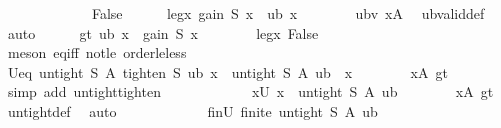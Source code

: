 \begin{isabellebody}
\ \ \ \ \isamarkupfalse%
\isanewline
\ \ \isamarkupfalse%
\isanewline
\ \ \ \ \isamarkupfalse%
\ False\isanewline
\ \ \ \ \isamarkupfalse%
\ le{\isacharunderscore}{\kern0pt}gx{\isacharcolon}{\kern0pt}\ {\isachardoublequoteopen}gain\ S\ {\isacharquery}{\kern0pt}x\ {\isasymle}\ ub\ {\isacharquery}{\kern0pt}x{\isachardoublequoteclose}\isanewline
\ \ \ \ \ \ \isamarkupfalse%
\ ubv\ xA\ \isamarkupfalse%
\ ub{\isacharunderscore}{\kern0pt}valid{\isacharunderscore}{\kern0pt}def\ \isamarkupfalse%
\ auto\isanewline
\ \ \ \ \isamarkupfalse%
\ gt{\isacharcolon}{\kern0pt}\ {\isachardoublequoteopen}ub\ {\isacharquery}{\kern0pt}x\ {\isachargreater}{\kern0pt}\ gain\ S\ {\isacharquery}{\kern0pt}x{\isachardoublequoteclose}\isanewline
\ \ \ \ \ \ \isamarkupfalse%
\ le{\isacharunderscore}{\kern0pt}gx\ False\ \isamarkupfalse%
\ {\isacharparenleft}{\kern0pt}meson\ eq{\isacharunderscore}{\kern0pt}iff\ not{\isacharunderscore}{\kern0pt}le\ order{\isacharunderscore}{\kern0pt}le{\isacharunderscore}{\kern0pt}less{\isacharparenright}{\kern0pt}\isanewline
\isanewline
\ \ \ \ \isamarkupfalse%
\ Ueq{\isacharcolon}{\kern0pt}\ {\isachardoublequoteopen}untight\ S\ A\ {\isacharparenleft}{\kern0pt}tighten\ S\ ub\ {\isacharquery}{\kern0pt}x{\isacharparenright}{\kern0pt}\ {\isacharequal}{\kern0pt}\ untight\ S\ A\ ub\ {\isacharminus}{\kern0pt}\ {\isacharbraceleft}{\kern0pt}{\isacharquery}{\kern0pt}x{\isacharbraceright}{\kern0pt}{\isachardoublequoteclose}\isanewline
\ \ \ \ \ \ \isamarkupfalse%
\ xA\ gt\ \isamarkupfalse%
\ {\isacharparenleft}{\kern0pt}simp\ add{\isacharcolon}{\kern0pt}\ untight{\isacharunderscore}{\kern0pt}tighten{\isacharparenright}{\kern0pt}\isanewline
\ \ \ \ \ \ \isanewline
\ \ \ \ \isamarkupfalse%
\ xU{\isacharcolon}{\kern0pt}\ {\isachardoublequoteopen}{\isacharquery}{\kern0pt}x\ {\isasymin}\ untight\ S\ A\ ub{\isachardoublequoteclose}\isanewline
\ \ \ \ \ \ \isamarkupfalse%
\ xA\ gt\ \isamarkupfalse%
\ untight{\isacharunderscore}{\kern0pt}def\ \isamarkupfalse%
\ auto\isanewline
\ \ \ \ \ \ \isanewline
\ \ \ \ \isamarkupfalse%
\ finU{\isacharcolon}{\kern0pt}\ {\isachardoublequoteopen}finite\ {\isacharparenleft}{\kern0pt}untight\ S\ A\ ub{\isacharparenright}{\kern0pt}{\isachardoublequoteclose}\isanewline
\ \ \ \ \ \ \isamarkupfalse%

\end{isabellebody}
